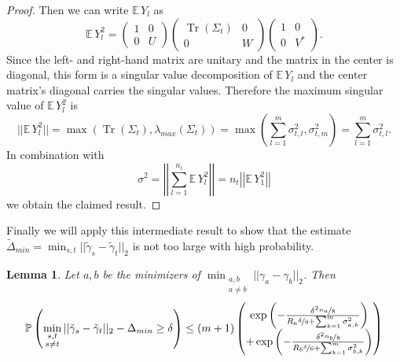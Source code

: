 \documentclass[10pt,a4paper]{article}
\newtheorem{lemma}{Lemma}
\DeclareMathOperator{\Tr}{Tr}
\begin{document}
\begin{proof}
  Then we can write $\mathbb{E}\,Y_{l}$ as
  \begin{equation*}
    \mathbb{E}\,Y_{l}^{2} = \begin{pmatrix}
      1 & 0\\
      0 & U
    \end{pmatrix}
    \begin{pmatrix}
      \Tr(\Sigma_{t}) & 0\\
      0 & W
    \end{pmatrix}
    \begin{pmatrix}
      1 & 0\\
      0 & V^{*}
    \end{pmatrix}.
  \end{equation*}
  Since the left- and right-hand matrix are unitary and the matrix in the center is diagonal, this form is a singular value decomposition of $\mathbb{E}\,Y_{l}$ and the center matrix's diagonal carries the singular values.
  Therefore the maximum singular value of $\mathbb{E}\,Y_{l}^{2}$ is
  \begin{equation*}
    ||\mathbb{E}\,Y_{l}^{2}|| = \max\left( \Tr(\Sigma_{t}), \lambda_{max}(\Sigma_{t}) \right) = \max\left( \sum_{l = 1}^{m} \sigma_{t, l}^{2}, \sigma_{t, m}^{2} \right) = \sum_{l = 1}^{m} \sigma_{t, l}^{2}.
  \end{equation*}
  In combination with
  \begin{equation*}
    \sigma^{2} = \left|\left| \sum_{l = 1}^{n_{t}} \mathbb{E}\,Y_{l}^{2} \right|\right| = n_{t} \left|\left| \mathbb{E}\,Y_{1}^{2} \right|\right|
  \end{equation*}
  we obtain the claimed result.
\end{proof}

Finally we will apply this intermediate result to show that the estimate $\tilde{\Delta}_{min} = \min_{s, t} ||\tilde{\gamma}_{s} - \tilde{\gamma}_{t}||_{2}$ is not too large with high probability.

\vspace{.5em}
\begin{lemma}
  \label{lemma:bound}
  Let $a, b$ be the minimizers of $\min_{\substack{a, b\\a \ne b}} ||\gamma_{a} - \gamma_{b}||_{2}$.
  Then
  \begin{equation*}
    \mathbb{P}\left( \min_{\substack{s, t\\s \ne t}} ||\tilde{\gamma}_{s} - \tilde{\gamma}_{t}||_{2} - \Delta_{min} \ge \delta \right) \le (m + 1) \begin{pmatrix} \exp\left( -\frac{\delta^{2} \nicefrac{n_{a}}{8}}{R_{a} \nicefrac{\delta}{6} + \sum_{k = 1}^{m} \sigma_{a,k}^{2}} \right)\\ + \exp\left( -\frac{\delta^{2} \nicefrac{n_{b}}{8}}{R_{b} \nicefrac{\delta}{6} + \sum_{k = 1}^{m} \sigma_{b,k}^{2}} \right) \end{pmatrix}
  \end{equation*}
\end{lemma}
\end{document}
